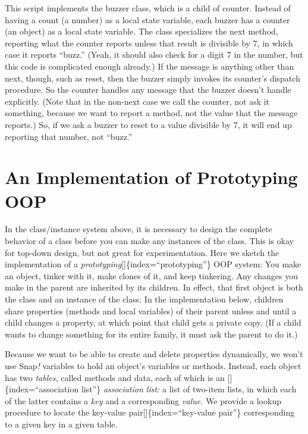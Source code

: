 \documentclass[
  letterpaper,
]{book}
\begin{document}
This script implements the buzzer class, which is a child of counter.
Instead of having a count (a number) as a local state variable, each
buzzer has a counter (an object) as a local state variable. The class
specializes the next method, reporting what the counter reports unless
that result is divisible by 7, in which case it reports ``buzz.'' (Yeah,
it should also check for a digit 7 in the number, but this code is
complicated enough already.) If the message is anything other than next,
though, such as reset, then the buzzer simply invokes its counter's
dispatch procedure. So the counter handles any message that the buzzer
doesn't handle explicitly. (Note that in the non-next case we call the
counter, not ask it something, because we want to report a method, not
the value that the message reports.) So, if we ask a buzzer to reset to
a value divisible by 7, it will end up reporting that number, not
``buzz.''

\section{An Implementation of Prototyping
OOP}\label{an-implementation-of-prototyping-oop}

In the class/instance system above, it is necessary to design the
complete behavior of a class before you can make any instances of the
class. This is okay for top-down design, but not great for
experimentation. Here we sketch the implementation of a
\emph{prototyping}{[}{]}\{index=``prototyping''\} OOP system: You make
an object, tinker with it, make clones of it, and keep tinkering. Any
changes you make in the parent are inherited by its children. In effect,
that first object is both the class and an instance of the class. In the
implementation below, children share properties (methods and local
variables) of their parent unless and until a child changes a property,
at which point that child gets a private copy. (If a child wants to
change something for its entire family, it must ask the parent to do
it.)

Because we want to be able to create and delete properties dynamically,
we won't use Snap\emph{!} variables to hold an object's variables or
methods. Instead, each object has two \emph{tables,} called methods and
data, each of which is an {[}{]}\{index=``association list''\}
\emph{association list:} a list of two-item lists, in which each of the
latter contains a \emph{key} and a corresponding \emph{value.} We
provide a lookup procedure to locate the key-value
pair{[}{]}\{index=``key-value pair''\} corresponding to a given key in a
given table.
\end{document}
